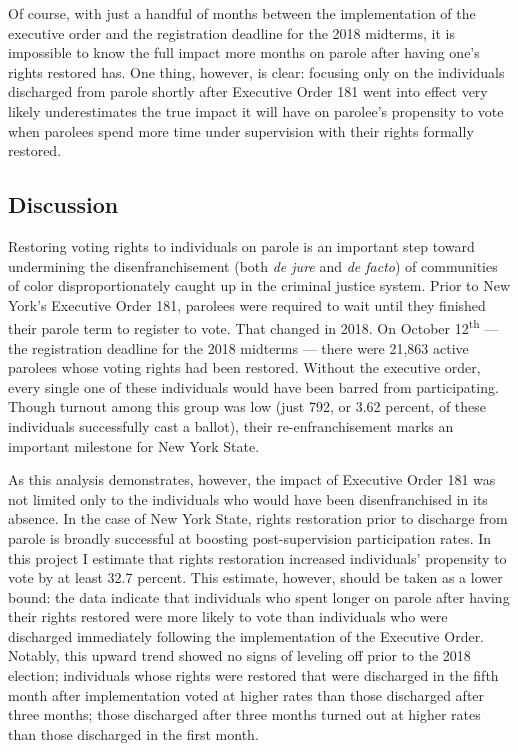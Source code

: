 \documentclass[
  12pt,
]{article}
\begin{document}
Of course, with just a handful of months between the implementation of the executive order and the registration deadline for the 2018 midterms, it is impossible to know the full impact more months on parole after having one's rights restored has. One thing, however, is clear: focusing only on the individuals discharged from parole shortly after Executive Order 181 went into effect very likely underestimates the true impact it will have on parolee's propensity to vote when parolees spend more time under supervision with their rights formally restored.

\hypertarget{discussion-1}{%
\subsection*{Discussion}\label{discussion-1}}

Restoring voting rights to individuals on parole is an important step toward undermining the disenfranchisement (both \emph{de jure} and \emph{de facto}) of communities of color disproportionately caught up in the criminal justice system. Prior to New York's Executive Order 181, parolees were required to wait until they finished their parole term to register to vote. That changed in 2018. On October 12\textsuperscript{th} --- the registration deadline for the 2018 midterms --- there were 21,863 active parolees whose voting rights had been restored. Without the executive order, every single one of these individuals would have been barred from participating. Though turnout among this group was low (just 792, or 3.62 percent, of these individuals successfully cast a ballot), their re-enfranchisement marks an important milestone for New York State.

As this analysis demonstrates, however, the impact of Executive Order 181 was not limited only to the individuals who would have been disenfranchised in its absence. In the case of New York State, rights restoration prior to discharge from parole is broadly successful at boosting post-supervision participation rates. In this project I estimate that rights restoration increased individuals' propensity to vote by at least 32.7 percent. This estimate, however, should be taken as a lower bound: the data indicate that individuals who spent longer on parole after having their rights restored were more likely to vote than individuals who were discharged immediately following the implementation of the Executive Order. Notably, this upward trend showed no signs of leveling off prior to the 2018 election; individuals whose rights were restored that were discharged in the fifth month after implementation voted at higher rates than those discharged after three months; those discharged after three months turned out at higher rates than those discharged in the first month.
\end{document}
